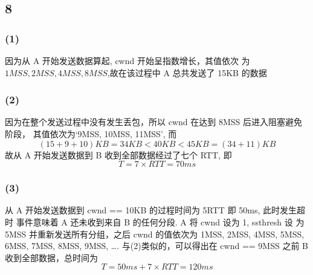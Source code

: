 \documentclass[UTF8]{ctexart}
\begin{document}
\begin{sloppypar}
\subsection*{8}
    \subsubsection*{(1)}
        因为从 A 开始发送数据算起, cwnd 开始呈指数增长，其值依次
        为$1MSS, 2MSS, 4MSS, 8MSS$,故在该过程中 A 总共发送了 15KB 的数据
    \subsubsection*{(2)}
        因为在整个发送过程中没有发生丢包，所以 cwnd 在达到 8MSS 后进入阻塞避免阶段，
        其值依次为`9MSS, 10MSS, 11MSS', 而$$(15 + 9 + 10)KB = 34KB < 40KB <
        45KB = (34 + 11)KB$$故从 A 开始发送数据到 B 收到全部数据经过了七个 RTT,
        即$$T = 7 \times RTT = 70ms$$
    \subsubsection*{(3)}
        从 A 开始发送数据到 cwnd == 10KB 的过程时间为 5RTT 即 50ms, 此时发生超时
        事件意味着 A 还未收到来自 B 的任何分段. A 将 cwnd 设为 1, ssthresh 设
        为 5MSS 并重新发送所有分组，之后 cwnd 的值依次为 1MSS, 2MSS, 4MSS, 5MSS,
        6MSS, 7MSS, 8MSS, 9MSS, \dots. 与(2)类似的，可以得出在 cwnd == 9MSS
        之前 B 收到全部数据，总时间为$$T = 50ms + 7 \times RTT = 120ms$$

\end{sloppypar}
\end{document}
